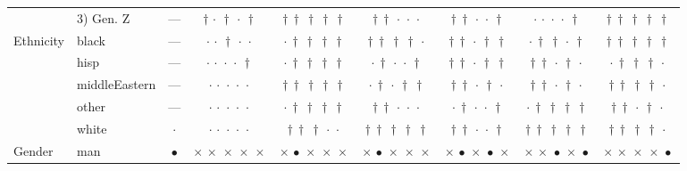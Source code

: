 {\begin{longtable}[t]{llccccccc}
 & 3) Gen. Z & --- & ${\dagger}\,{\cdot}\,{\dagger}\,{\cdot}\,{\dagger}$ & ${\dagger}\,{\dagger}\,{\dagger}\,{\dagger}\,{\dagger}$ & ${\dagger}\,{\dagger}\,{\cdot}\,{\cdot}\,{\cdot}$ & ${\dagger}\,{\dagger}\,{\cdot}\,{\cdot}\,{\dagger}$ & ${\cdot}\,{\cdot}\,{\cdot}\,{\cdot}\,{\dagger}$ & ${\dagger}\,{\dagger}\,{\dagger}\,{\dagger}\,{\dagger}$ \\
\cline{1-9}
\multirow[t]{5}{*}{Ethnicity} & black & --- & ${\cdot}\,{\cdot}\,{\dagger}\,{\cdot}\,{\cdot}$ & ${\cdot}\,{\dagger}\,{\dagger}\,{\dagger}\,{\dagger}$ & ${\dagger}\,{\dagger}\,{\dagger}\,{\dagger}\,{\cdot}$ & ${\dagger}\,{\dagger}\,{\cdot}\,{\dagger}\,{\dagger}$ & ${\cdot}\,{\dagger}\,{\dagger}\,{\cdot}\,{\dagger}$ & ${\dagger}\,{\dagger}\,{\dagger}\,{\dagger}\,{\dagger}$ \\
 & hisp & --- & ${\cdot}\,{\cdot}\,{\cdot}\,{\cdot}\,{\dagger}$ & ${\cdot}\,{\dagger}\,{\dagger}\,{\dagger}\,{\dagger}$ & ${\cdot}\,{\dagger}\,{\cdot}\,{\cdot}\,{\dagger}$ & ${\dagger}\,{\dagger}\,{\cdot}\,{\dagger}\,{\dagger}$ & ${\dagger}\,{\dagger}\,{\cdot}\,{\dagger}\,{\cdot}$ & ${\cdot}\,{\dagger}\,{\dagger}\,{\dagger}\,{\cdot}$ \\
 & middleEastern & --- & ${\cdot}\,{\cdot}\,{\cdot}\,{\cdot}\,{\cdot}$ & ${\dagger}\,{\dagger}\,{\dagger}\,{\dagger}\,{\dagger}$ & ${\cdot}\,{\dagger}\,{\cdot}\,{\dagger}\,{\dagger}$ & ${\dagger}\,{\dagger}\,{\cdot}\,{\dagger}\,{\cdot}$ & ${\dagger}\,{\dagger}\,{\cdot}\,{\dagger}\,{\cdot}$ & ${\dagger}\,{\dagger}\,{\dagger}\,{\dagger}\,{\cdot}$ \\
 & other & --- & ${\cdot}\,{\cdot}\,{\cdot}\,{\cdot}\,{\cdot}$ & ${\cdot}\,{\dagger}\,{\dagger}\,{\dagger}\,{\dagger}$ & ${\dagger}\,{\dagger}\,{\cdot}\,{\cdot}\,{\cdot}$ & ${\cdot}\,{\dagger}\,{\cdot}\,{\cdot}\,{\dagger}$ & ${\cdot}\,{\dagger}\,{\dagger}\,{\dagger}\,{\dagger}$ & ${\dagger}\,{\dagger}\,{\cdot}\,{\dagger}\,{\cdot}$ \\
 & white & $\cdot$ & ${\cdot}\,{\cdot}\,{\cdot}\,{\cdot}\,{\cdot}$ & ${\dagger}\,{\dagger}\,{\dagger}\,{\cdot}\,{\cdot}$ & ${\dagger}\,{\dagger}\,{\dagger}\,{\dagger}\,{\dagger}$ & ${\dagger}\,{\dagger}\,{\cdot}\,{\cdot}\,{\dagger}$ & ${\dagger}\,{\dagger}\,{\dagger}\,{\dagger}\,{\dagger}$ & ${\dagger}\,{\dagger}\,{\dagger}\,{\dagger}\,{\cdot}$ \\
\cline{1-9}
\multirow[t]{3}{*}{Gender} & man & $\bullet$ & ${\times}\,{\times}\,{\times}\,{\times}\,{\times}$ & ${\times}\,{\bullet}\,{\times}\,{\times}\,{\times}$ & ${\times}\,{\bullet}\,{\times}\,{\times}\,{\times}$ & ${\times}\,{\bullet}\,{\times}\,{\bullet}\,{\times}$ & ${\times}\,{\times}\,{\bullet}\,{\times}\,{\bullet}$ & ${\times}\,{\times}\,{\times}\,{\times}\,{\bullet}$ \\

\end{longtable}}
